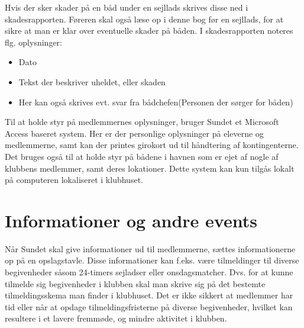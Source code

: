 Hvis der sker skader på en båd under en sejllads skrives disse ned i skadesrapporten. 
Føreren skal også læse op i denne bog før en sejllads, for at sikre at man er klar over eventuelle skader på båden.
I skadesrapporten noteres flg. oplysninger:

\begin{itemize}
	\item Dato
	\item Tekst der beskriver uheldet, eller skaden
	\item Her kan også skrives evt. svar fra bådchefen(Personen der sørger for båden)
\end{itemize}

Til at holde styr på medlemmernes oplysninger, bruger Sundet et Microsoft Access baseret system. Her er der personlige oplysninger på eleverne og medlemmerne, samt kan der printes girokort ud til håndtering af kontingenterne. Det bruges også til at holde styr på bådene i havnen som er ejet af nogle af klubbens medlemmer, samt deres lokationer. Dette system kan kun tilgås lokalt på computeren lokaliseret i klubhuset.

\section{Informationer og andre events}

Når Sundet skal give informationer ud til medlemmerne, sættes informationerne op på en opslagstavle.
Disse informationer kan f.eks. være tilmeldinger til diverse begivenheder såsom 24-timers sejladser eller onsdagsmatcher. 
Dvs. for at kunne tilmelde sig begivenheder i klubben skal man skrive sig på det bestemte tilmeldingsskema man finder i klubhuset. 
Det er ikke sikkert at medlemmer har tid eller når at opdage tilmeldingsfristerne på diverse begivenheder, hvilket kan resultere i et lavere fremmøde, og mindre aktivitet i klubben.
